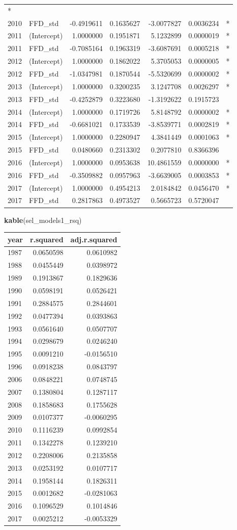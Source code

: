 \documentclass[]{article}
\newenvironment{Shaded}{\begin{snugshade}}{\end{snugshade}}
\newcommand{\KeywordTok}[1]{\textcolor[rgb]{0.13,0.29,0.53}{\textbf{#1}}}
\newcommand{\NormalTok}[1]{#1}
\begin{document}
\begin{longtable}[]{@{}llrrrrl@{}}
*\tabularnewline
2010 & FFD\_std & -0.4919611 & 0.1635627 & -3.0077827 & 0.0036234 &
*\tabularnewline
2011 & (Intercept) & 1.0000000 & 0.1951871 & 5.1232899 & 0.0000019 &
*\tabularnewline
2011 & FFD\_std & -0.7085164 & 0.1963319 & -3.6087691 & 0.0005218 &
*\tabularnewline
2012 & (Intercept) & 1.0000000 & 0.1862022 & 5.3705053 & 0.0000005 &
*\tabularnewline
2012 & FFD\_std & -1.0347981 & 0.1870544 & -5.5320699 & 0.0000002 &
*\tabularnewline
2013 & (Intercept) & 1.0000000 & 0.3200235 & 3.1247708 & 0.0026297 &
*\tabularnewline
2013 & FFD\_std & -0.4252879 & 0.3223680 & -1.3192622 & 0.1915723
&\tabularnewline
2014 & (Intercept) & 1.0000000 & 0.1719726 & 5.8148792 & 0.0000002 &
*\tabularnewline
2014 & FFD\_std & -0.6681021 & 0.1733539 & -3.8539771 & 0.0002819 &
*\tabularnewline
2015 & (Intercept) & 1.0000000 & 0.2280947 & 4.3841449 & 0.0001063 &
*\tabularnewline
2015 & FFD\_std & 0.0480660 & 0.2313302 & 0.2077810 & 0.8366396
&\tabularnewline
2016 & (Intercept) & 1.0000000 & 0.0953638 & 10.4861559 & 0.0000000 &
*\tabularnewline
2016 & FFD\_std & -0.3509882 & 0.0957963 & -3.6639005 & 0.0003853 &
*\tabularnewline
2017 & (Intercept) & 1.0000000 & 0.4954213 & 2.0184842 & 0.0456470 &
*\tabularnewline
2017 & FFD\_std & 0.2817863 & 0.4973527 & 0.5665723 & 0.5720047
&\tabularnewline
\bottomrule
\end{longtable}

\begin{Shaded}
\begin{Highlighting}[]
\KeywordTok{kable}\NormalTok{(sel_models1_rsq)}
\end{Highlighting}
\end{Shaded}

\begin{longtable}[]{@{}lrr@{}}
\toprule
year & r.squared & adj.r.squared\tabularnewline
\midrule
\endhead
1987 & 0.0650598 & 0.0610982\tabularnewline
1988 & 0.0455449 & 0.0398972\tabularnewline
1989 & 0.1913867 & 0.1829636\tabularnewline
1990 & 0.0598191 & 0.0526421\tabularnewline
1991 & 0.2884575 & 0.2844601\tabularnewline
1992 & 0.0477394 & 0.0393863\tabularnewline
1993 & 0.0561640 & 0.0507707\tabularnewline
1994 & 0.0298679 & 0.0246240\tabularnewline
1995 & 0.0091210 & -0.0156510\tabularnewline
1996 & 0.0918238 & 0.0843797\tabularnewline
2006 & 0.0848221 & 0.0748745\tabularnewline
2007 & 0.1380804 & 0.1287117\tabularnewline
2008 & 0.1858683 & 0.1755628\tabularnewline
2009 & 0.0107377 & -0.0060295\tabularnewline
2010 & 0.1116239 & 0.0992854\tabularnewline
2011 & 0.1342278 & 0.1239210\tabularnewline
2012 & 0.2208006 & 0.2135858\tabularnewline
2013 & 0.0253192 & 0.0107717\tabularnewline
2014 & 0.1958144 & 0.1826311\tabularnewline
2015 & 0.0012682 & -0.0281063\tabularnewline
2016 & 0.1096529 & 0.1014846\tabularnewline
2017 & 0.0025212 & -0.0053329\tabularnewline
\bottomrule
\end{longtable}
\end{document}
